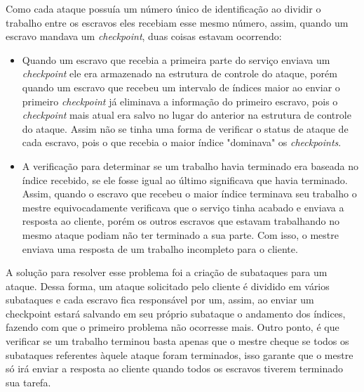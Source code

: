 \documentclass[
	12pt,				%
    oneside,			%
	a4paper,			%
	english,			%
	brazil,				%
	]{abntex2}
\begin{document}
Como cada ataque possuía um número único de identificação ao dividir o trabalho entre os escravos eles recebiam esse mesmo número, assim, quando um escravo mandava um \textit{checkpoint}, duas coisas estavam ocorrendo: 

\begin{itemize}

	\item Quando um escravo que recebia a primeira parte do serviço enviava um \textit{checkpoint} ele era armazenado na estrutura de controle do ataque, porém quando um escravo que recebeu um intervalo de índices maior ao enviar o primeiro \textit{checkpoint} já eliminava a informação do primeiro escravo, pois o \textit{checkpoint} mais atual era salvo no lugar do anterior na estrutura de controle do ataque. Assim não se tinha uma forma de verificar o status de ataque de cada escravo, pois o que recebia o maior índice "dominava" os \textit{checkpoints}.

	\item A verificação para determinar se um trabalho havia terminado era baseada no índice recebido, se ele fosse igual ao último significava que havia terminado. Assim, quando o escravo que recebeu o maior índice terminava seu trabalho o mestre 
equivocadamente verificava que o serviço tinha acabado e enviava a resposta ao cliente, porém os outros escravos que estavam trabalhando no
mesmo ataque podiam não ter terminado a sua parte. Com isso, o mestre enviava uma resposta de um trabalho incompleto para o cliente.

\end{itemize}

A solução para resolver esse problema foi a criação de subataques para um ataque. Dessa forma, um ataque solicitado pelo cliente é dividido em vários subataques e cada escravo fica responsável por um, assim, ao enviar um checkpoint estará salvando em seu próprio subataque o andamento dos índices, fazendo com que o primeiro problema não ocorresse mais. Outro ponto, é que verificar se um trabalho terminou basta apenas que o mestre cheque se todos os subataques referentes àquele ataque foram terminados, isso garante que o mestre só irá enviar a resposta ao cliente quando todos os escravos tiverem terminado sua tarefa.
\end{document}
